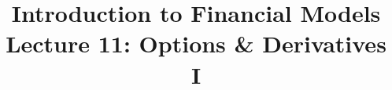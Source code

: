 \documentclass[10pt]{beamer}
\title{Introduction to Financial Models\\Lecture 11: Options \& Derivatives I}
\author{}
\date{}
\begin{document}
\begin{frame}
\titlepage
\end{frame}


%  
%  
\end{document}
